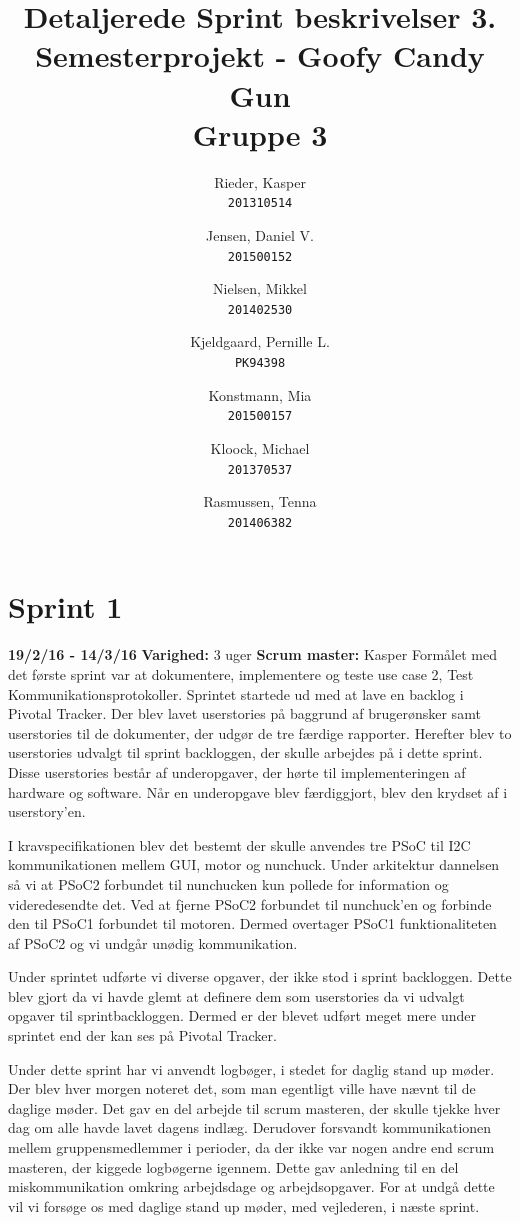 \documentclass[a4paper,oneside,article]{memoir}
\title{Detaljerede Sprint beskrivelser 3. Semesterprojekt - Goofy Candy Gun\\ Gruppe 3}
\author{
  Rieder, Kasper\\
  \texttt{201310514}
  \and
  Jensen, Daniel V.\\
  \texttt{201500152}
  \and
  Nielsen, Mikkel\\
  \texttt{201402530}
  \and
  Kjeldgaard, Pernille L.\\
  \texttt{PK94398}
  \and
  Konstmann, Mia\\
  \texttt{201500157}
  \and
  Kloock, Michael\\
  \texttt{201370537}
  \and
  Rasmussen, Tenna\\
  \texttt{201406382}
}
\begin{document}
	
	\frontmatter
	\maketitle

	\section{Sprint 1}
	\textbf{19/2/16 - 14/3/16}\newline
	\textbf{Varighed:} 3 uger\newline
	\textbf{Scrum master: }Kasper \newline \newline
	Formålet med det første sprint var at dokumentere, implementere og teste use case 2, Test Kommunikationsprotokoller.
	Sprintet startede ud med at lave en backlog i Pivotal Tracker. Der blev lavet userstories på baggrund af brugerønsker samt userstories til de dokumenter, der udgør de tre færdige rapporter. Herefter blev to userstories udvalgt til sprint backloggen, der skulle arbejdes på i dette sprint. Disse userstories består af underopgaver, der hørte til implementeringen af hardware og software. Når en underopgave blev færdiggjort, blev den krydset af i userstory'en. \newline
	
	I kravspecifikationen blev det bestemt der skulle anvendes tre PSoC til I2C kommunikationen mellem GUI, motor og nunchuck. Under arkitektur dannelsen så vi at PSoC2 forbundet til nunchucken kun pollede for information og videredesendte det. Ved at fjerne PSoC2 forbundet til nunchuck'en og forbinde den til PSoC1 forbundet til motoren. Dermed overtager PSoC1 funktionaliteten af PSoC2 og vi undgår unødig kommunikation. \newline
	
	Under sprintet udførte vi diverse opgaver, der ikke stod i sprint backloggen. Dette blev gjort da vi havde glemt at definere dem som userstories da vi udvalgt opgaver til sprintbackloggen. Dermed er der blevet udført meget mere under sprintet end der kan ses på Pivotal Tracker. \newline
	
	Under dette sprint har vi anvendt logbøger, i stedet for daglig stand up møder. Der blev hver morgen noteret det, som man egentligt ville have nævnt til de daglige møder. Det gav en del arbejde til scrum masteren, der skulle tjekke hver dag om alle havde lavet dagens indlæg. Derudover forsvandt kommunikationen mellem gruppensmedlemmer i perioder, da der ikke var nogen andre end scrum masteren, der kiggede logbøgerne igennem. Dette gav anledning til en del miskommunikation omkring arbejdsdage og arbejdsopgaver. For at undgå dette vil vi forsøge os med daglige stand up møder, med vejlederen, i næste sprint. \newline
	
\end{document}
